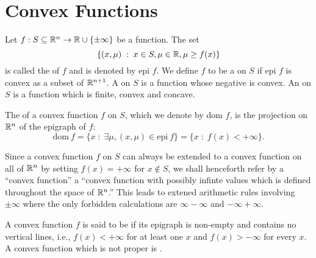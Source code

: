 \documentclass[11pt,a4paper]{article}
\begin{document}
\section{Convex Functions}

\begin{definition}
    Let $f:S\subseteq \mathbb{R}^n\rightarrow \mathbb{R}\cup \{\pm \infty\}$ be a function. The set 
    \begin{equation*}
        \{(x,\mu)\;:\; x\in S,\mu\in \mathbb{R},\mu\ge f(x)\}
    \end{equation*}
    is called the  of $f$ and is denoted by epi $f$. We define $f$ to be a  on $S$ if epi $f$ is convex as a subset of $\mathbb{R}^{n+1}$. A  on $S$ is a function whose negative is convex. An  on $S$ is a function which is finite, convex and concave.
\end{definition}

\begin{definition}\label{def:effective_domain}
    The  of a convex function $f$ on $S$, which we denote by dom $f$, is the projection on $\mathbb{R}^n$ of the epigraph of $f$:
    \begin{equation*}
        \text{dom}\ f = \{x\;:\;\exists \mu,(x,\mu)\in\text{epi}\ f\} = \{x\;:\;f(x)<+\infty\}.
    \end{equation*}
\end{definition}

\begin{remark}
% 
    Since a convex function $f$ on $S$ can always be extended to a convex function on all of $\mathbb{R}^n$ by setting $f(x) = +\infty$ for $x\notin S$, we shall henceforth refer by a ``convex function'' a  ``convex function with possibly infinte values which is defined throughout the space of $\mathbb{R}^n$.'' This leads to extened arithmetic rules involving $\pm \infty$ where the only forbidden calculations are $\infty -\infty$ and $-\infty + \infty$.
\end{remark}

\begin{definition}
    A convex function $f$ is said to be  if its epigraph is non-empty and contains no vertical lines, i.e., $f(x)<+\infty$ for at least one $x$ and $f(x)>-\infty$ for every $x$. A convex function which is not proper is .
\end{definition}
\end{document}
